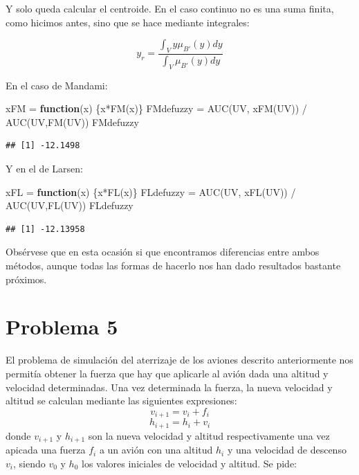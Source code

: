 \documentclass[
]{article}
\newenvironment{Shaded}{\begin{snugshade}}{\end{snugshade}}
\newcommand{\ControlFlowTok}[1]{\textcolor[rgb]{0.13,0.29,0.53}{\textbf{#1}}}
\newcommand{\FunctionTok}[1]{\textcolor[rgb]{0.00,0.00,0.00}{#1}}
\newcommand{\NormalTok}[1]{#1}
\newcommand{\OtherTok}[1]{\textcolor[rgb]{0.56,0.35,0.01}{#1}}
\newcommand{\SpecialCharTok}[1]{\textcolor[rgb]{0.00,0.00,0.00}{#1}}
\begin{document}
Y solo queda calcular el centroide. En el caso continuo no es una suma
finita, como hicimos antes, sino que se hace mediante integrales:

\[y_{r}=\frac{\int_{V}y\mu_{B'}\left(y\right)dy}{\int_{V}\mu_{B'}\left(y\right)dy}\]

En el caso de Mandami:

\begin{Shaded}
\begin{Highlighting}[]
\NormalTok{xFM }\OtherTok{=} \ControlFlowTok{function}\NormalTok{(x) \{x}\SpecialCharTok{*}\FunctionTok{FM}\NormalTok{(x)\}}
\NormalTok{FMdefuzzy }\OtherTok{=} \FunctionTok{AUC}\NormalTok{(UV, }\FunctionTok{xFM}\NormalTok{(UV)) }\SpecialCharTok{/} \FunctionTok{AUC}\NormalTok{(UV,}\FunctionTok{FM}\NormalTok{(UV))}
\NormalTok{FMdefuzzy}
\end{Highlighting}
\end{Shaded}

\begin{verbatim}
## [1] -12.1498
\end{verbatim}

Y en el de Larsen:

\begin{Shaded}
\begin{Highlighting}[]
\NormalTok{xFL }\OtherTok{=} \ControlFlowTok{function}\NormalTok{(x) \{x}\SpecialCharTok{*}\FunctionTok{FL}\NormalTok{(x)\}}
\NormalTok{FLdefuzzy }\OtherTok{=} \FunctionTok{AUC}\NormalTok{(UV, }\FunctionTok{xFL}\NormalTok{(UV)) }\SpecialCharTok{/} \FunctionTok{AUC}\NormalTok{(UV,}\FunctionTok{FL}\NormalTok{(UV))}
\NormalTok{FLdefuzzy}
\end{Highlighting}
\end{Shaded}

\begin{verbatim}
## [1] -12.13958
\end{verbatim}

Obsérvese que en esta ocasión si que encontramos diferencias entre ambos
métodos, aunque todas las formas de hacerlo nos han dado resultados
bastante próximos.

\newpage

\hypertarget{problema-5}{%
\section{Problema 5}\label{problema-5}}

El problema de simulación del aterrizaje de los aviones descrito
anteriormente nos permitía obtener la fuerza que hay que aplicarle al
avión dada una altitud y velocidad determinadas. Una vez determinada la
fuerza, la nueva velocidad y altitud se calculan mediante las siguientes
expresiones: \[v_{i+1}=v_{i}+f_{i}\] \[h_{i+1}=h_{i}+v_{i}\] donde
\(v_{i+1}\) y \(h_{i+1}\) son la nueva velocidad y altitud
respectivamente una vez apicada una fuerza \(f_{i}\) a un avión con una
altitud \(h_{i}\) y una velocidad de descenso \(v_{i}\), siendo
\(v_{0}\) y \(h_{0}\) los valores iniciales de velocidad y altitud. Se
pide:
\end{document}
